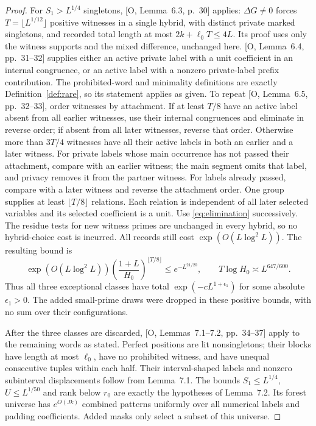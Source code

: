 \documentclass[11pt]{article}
\theoremstyle{definition}
\theoremstyle{remark}
\numberwithin{equation}{section}
\begin{document}
\begin{proof}
For $S_1>L^{1/4}$ singletons, [O, Lemma~6.3, p.~30] applies: $\Delta G\ne0$ forces
$T=\lfloor L^{1/12}\rfloor$ positive witnesses in a single hybrid, with distinct private marked singletons,
and recorded total length at most $2k+\ell_0T\le4L$.
Its proof uses only the witness supports and the mixed difference, unchanged here.
[O, Lemma~6.4, pp.~31--32] supplies either an active private label with a unit coefficient in an internal
congruence, or an active label with a nonzero private-label prefix contribution. The prohibited-word and
minimality definitions are exactly Definition~\ref{def:rare}, so its statement applies as given.
To repeat [O, Lemma~6.5, pp.~32--33], order witnesses by attachment. If at least $T/8$ have an active label
absent from all earlier witnesses, use their internal congruences and eliminate in reverse order; if absent from
all later witnesses, reverse that order. Otherwise more than $3T/4$ witnesses have all their active labels in both
an earlier and a later witness. For private labels whose main occurrence has not passed their attachment, compare
with an earlier witness; the main segment omits that label, and privacy removes it from the partner witness.
For labels already passed, compare with a later witness and reverse the attachment order.
One group supplies at least $\lfloor T/8\rfloor$ relations. Each relation is independent of all later selected
variables and its selected coefficient is a unit. Use \eqref{eq:elimination} successively. The residue tests for
new witness primes are unchanged in every hybrid, so no hybrid-choice cost is incurred. All records still cost
$\exp(O(L\log^2L))$. The resulting bound is
\begin{equation}\label{eq:singleton-cost}
 \exp(O(L\log^2L))\left(\frac{1+L}{H_0}\right)^{\lfloor T/8\rfloor}
 \le e^{-L^{21/20}},\qquad T\log H_0\asymp L^{647/600}.
\end{equation}
Thus all three exceptional classes have total $\exp(-cL^{1+\epsilon_1})$ for some absolute $\epsilon_1>0$.
The added small-prime draws were dropped in these positive bounds, with no sum over their configurations.

After the three classes are discarded, [O, Lemmas~7.1--7.2, pp.~34--37] apply to the remaining words as stated.
Perfect positions are lit nonsingletons; their blocks have length at most $\ell_0$, have no prohibited witness,
and have unequal consecutive tuples within each half. Their interval-shaped labels and nonzero subinterval
displacements follow from Lemma~7.1. The bounds $S_1\le L^{1/4}$, $U\le L^{1/50}$ and rank below $r_0$ are
exactly the hypotheses of Lemma~7.2. Its forest universe has $e^{O(Jk)}$ combined patterns uniformly over all
numerical labels and padding coefficients. Added masks only select a subset of this universe.


\end{proof}
\end{document}
